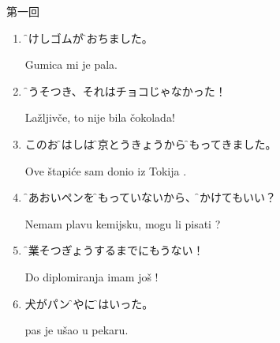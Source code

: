 \documentclass[intermediate]{grampig}
\begin{document}
	{\Large {} \hfill 第一回} \vspace{1em}
	
	\begin{enumerate}
		\item \parbox[t]{\linewidth}{\f{消}{け}しゴムが\f{落}{お}ちました。}
		\bh\strut
		Gumica mi je  pala.
		
		\item \f{嘘}{うそ}つき、それはチョコじゃなかった！
		\bh\strut
		Lažljivče, to nije bila  čokolada!
		
		\item このお\f{箸}{はし}は\f{東京}{とうきょう}から\f{持}{も}ってきました。
		\bh\strut
		Ove štapiće sam donio iz Tokija .
		
		\item \f{青}{あお}いペンを\f{持}{も}っていないから、\f{書}{か}けてもいい？
		\bh\strut
		Nemam plavu kemijsku, mogu li pisati ?
		
		\item \f{卒業}{そつぎょう}するまでにもうない！
		\bh\strut
		Do diplomiranja imam još !
				
		\item {}犬がパン\f{屋}{や}に\f{入}{はい}った。
		\bh\strut
		 pas je ušao u pekaru.
		
	\end{enumerate}
\end{document}
